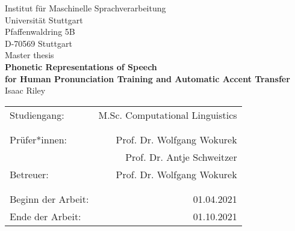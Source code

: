 \documentclass[12pt,leqno,a4paper]{article}
\newcommand{\Titel}{Phonetic Representations of Speech\\ 
for Human Pronunciation Training and Automatic Accent Transfer}
\begin{document}

\begin{titlepage}
  \large
   \begin{center}
    Institut für Maschinelle Sprachverarbeitung\\
    Universität Stuttgart\\
    Pfaffenwaldring 5B\\
    D-70569 Stuttgart\\    
    
    \vspace{2.5cm}
    Master thesis\\
    {\LARGE \bf \Titel} \\
    \vspace{2cm}
    Isaac Riley\\
       \vfill
    \begin{tabular}[t]{lr}
    Studiengang: & M.Sc. Computational Linguistics \\ %
    \\
    \\
    {Prüfer*innen:} & Prof. Dr. Wolfgang Wokurek\\
     & Prof. Dr. Antje Schweitzer\\
    {Betreuer:} & Prof. Dr. Wolfgang Wokurek\\ 
    \\
    \\
    {Beginn der Arbeit:} & 01.04.2021\\
    {Ende der Arbeit:} & 01.10.2021\\
    \end{tabular}
  \end{center}
\setlength{\hoffset}{0cm}

  \normalsize
\end{titlepage}


\newpage
\thispagestyle{empty}
\end{document}
